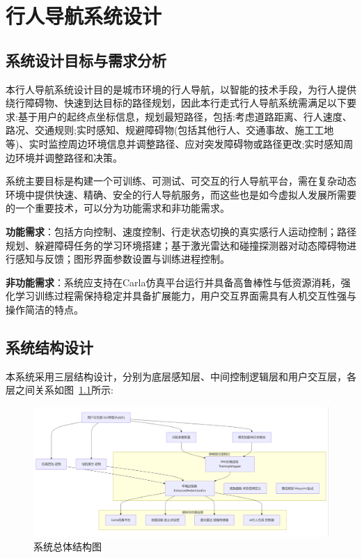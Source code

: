 \chapter{行人导航系统设计}
	
\section{系统设计目标与需求分析}
	
本行人导航系统设计目的是城市环境的行人导航，以智能的技术手段，为行人提供绕行障碍物、快速到达目标的路径规划，因此本行走式行人导航系统需满足以下要求:基于用户的起终点坐标信息，规划最短路径，包括:考虑道路距离、行人速度、路况、交通规则;实时感知、规避障碍物(包括其他行人、交通事故、施工工地等)、实时监控周边环境信息并调整路径、应对突发障碍物或路径更改;实时感知周边环境并调整路径和决策。

系统主要目标是构建一个可训练、可测试、可交互的行人导航平台，需在复杂动态环境中提供快速、精确、安全的行人导航服务，而这些也是如今虚拟人发展所需要的一个重要技术，可以分为功能需求和非功能需求。

\textbf{功能需求}：包括方向控制、速度控制、行走状态切换的真实感行人运动控制；路径规划、躲避障碍任务的学习环境搭建；基于激光雷达和碰撞探测器对动态障碍物进行感知与反馈；图形界面参数设置与训练进程控制。

\textbf{非功能需求}：系统应支持在Carla仿真平台运行并具备高鲁棒性与低资源消耗，强化学习训练过程需保持稳定并具备扩展能力，用户交互界面需具有人机交互性强与操作简洁的特点。

\section{系统结构设计}

本系统采用三层结构设计，分别为底层感知层、中间控制逻辑层和用户交互层，各层之间关系如图~\ref{fig:system-architecture}所示:

\begin{figure}[H]
    \centering
    \includegraphics[width=1\textwidth]{images/nav_system_architecture.png}
    \caption{系统总体结构图}
    \label{fig:system-architecture}
\end{figure}

